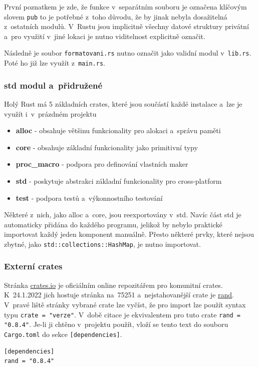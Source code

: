 \documentclass[a4paper, 12pt, twoside]{article} %
\newcommand{\rust}[1]{\texttt{#1}}
\begin{document}
		První poznatkem je zde, že funkce v~separátním souboru je označena klíčovým slovem \texttt{pub} to je potřebné z~toho důvodu, že by jinak nebyla dosažitelná z~ostatních modulů. V~Rustu jsou implicitně všechny datové struktury privátní a~pro využití v~jiné lokaci je nutno viditelnost explicitně označit.
		
		Následně je soubor \texttt{formatovani.rs} nutno označit jako validní modul v~\texttt{lib.rs}. Poté ho již lze využít z~\texttt{main.rs}.
		
		\subsubsection*{std modul a~přidružené}
			Holý Rust má 5 základních crates, které jsou součástí každé instalace a~lze je využít i~v~prázdném projektu
			\begin{itemize}
				\item \textbf{alloc} - obsahuje většinu funkcionality pro alokaci a~správu paměti
				\item \textbf{core} - obsahuje základní funkcionality jako primitivní typy
				\item \textbf{proc\_macro} - podpora pro definování vlastních maker
				\item \textbf{std} - poskytuje abstrakci základní funkcionality pro cross-platform
				\item \textbf{test} - podpora testů a~výkonnostního testování
			\end{itemize}

			Některé z~nich, jako alloc a~core, jsou reexportovány v~std. Navíc část std je automaticky přidána do každého programu, jelikož by nebylo praktické importovat každý jeden komponent manuálně. Přesto některé prvky, které nejsou zbytné, jako \rust{std::collections::HashMap}, je nutno importovat.

		\subsubsection*{Externí crates}
			Stránka \href{https://crates.io/}{crates.io} je oficiálním online repozitářem pro komunitní crates. K~24.1.2022 jich hostuje stránka na~75251 a~nejstahovanější crate je \href{https://crates.io/crates/rand}{rand}. V~pravé liště stránky vybrané crate lze vyčíst, že pro import lze použít syntax typu \texttt{crate = "verze"}. V~době citace je ekvivalentem pro tuto crate \texttt{rand = "0.8.4"}. Je-li ji chtěno v~projektu použít, vloží se tento text do souboru \texttt{Cargo.toml} do sekce \texttt{[dependencies]}.
			\begin{verbatim}
[dependencies]
rand = "0.8.4"
			\end{verbatim}
		
\end{document}
